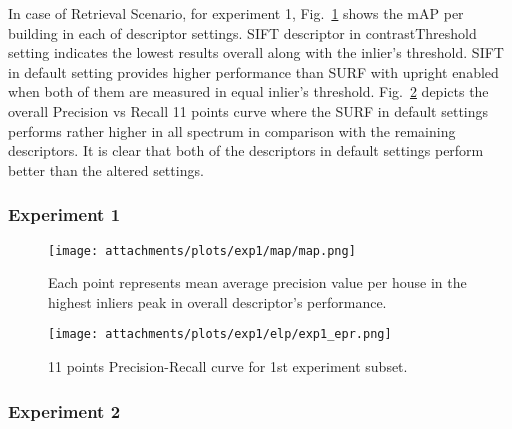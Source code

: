     In case of Retrieval Scenario, for experiment 1, Fig.~\ref{fig:exp1_bestmap} shows the mAP per building in each of descriptor settings. SIFT descriptor in contrastThreshold setting indicates the lowest results overall along with the inlier's threshold.
    SIFT in default setting provides higher performance than SURF with upright enabled when both of them are measured in equal inlier's threshold.
    Fig.~\ref{fig:exp1_elp} depicts the overall Precision vs Recall 11 points curve where the SURF in default settings performs rather higher in all spectrum in comparison with the remaining descriptors. It is clear that both of the descriptors in default settings perform better than the altered settings.

    
      \subsubsection{Experiment 1}\label{retrieval_exp1}
 
	    \begin{figure}[ht!] %
              \centering
              \texttt{[image: attachments/plots/exp1/map/map.png]}
              \caption{Each point represents mean average precision value per house in the highest inliers peak in overall descriptor's performance.}
              \label{fig:exp1_bestmap}
	    \end{figure}            
               \newpage 
	    \begin{figure}[ht!] %
              \centering
              \texttt{[image: attachments/plots/exp1/elp/exp1\_epr.png]}
              \caption{11 points Precision-Recall curve for 1st experiment subset.}
              \label{fig:exp1_elp}
	    \end{figure}
      
      \newpage
      \subsubsection{Experiment 2}\label{retrieval_exp2}
      

